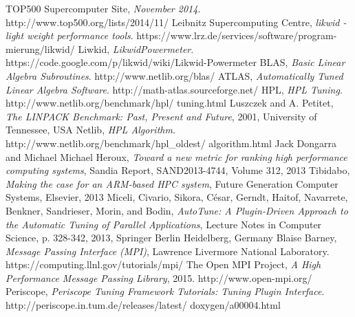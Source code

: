 \documentclass[10pt,twocolumn]{article}
\begin{document}
\begin{thebibliography}{9}
\raggedright
{}
  	TOP500 Supercomputer Site,
  	\emph{November 2014}.
  	http://www.top500.org/lists/2014/11/
	Leibnitz Supercomputing Centre,
	\emph{likwid - light weight performance tools}.
	https://www.lrz.de/services/software/program-mierung/likwid/
	Liwkid,
	\emph{LikwidPowermeter}.
	https://code.google.com/p/likwid/wiki/Likwid-Powermeter
	BLAS,
	\emph{Basic Linear Algebra Subroutines}.
	http://www.netlib.org/blas/
	ATLAS,
	\emph{Automatically Tuned Linear Algebra Software}.
	http://math-atlas.sourceforge.net/
	HPL,
	\emph{HPL Tuning}.
	http://www.netlib.org/benchmark/hpl/ tuning.html
	Luszczek and A. Petitet,
	\emph{The LINPACK Benchmark: Past, Present and Future},
	2001, University of Tennessee, USA
	Netlib,
	\emph{HPL Algorithm}.
	http://www.netlib.org/benchmark/hpl\_oldest/ algorithm.html
	Jack Dongarra and Michael Michael Heroux,
	\emph{Toward a new metric for ranking high performance computing systems},
	Sandia Report, SAND2013-4744, Volume 312, 2013
	Tibidabo,
	\emph{Making the case for an ARM-based HPC system},
	Future Generation Computer Systems, Elsevier, 2013
	Miceli, Civario, Sikora, César, Gerndt, Haitof, Navarrete, Benkner, Sandrieser, Morin, and Bodin,
	\emph{AutoTune: A Plugin-Driven Approach to the Automatic Tuning of Parallel Applications}, Lecture Notes in Computer Science, p. 328-342, 2013, Springer Berlin Heidelberg, Germany
	Blaise Barney,
	\emph{Message Passing Interface (MPI)},
	Lawrence Livermore National Laboratory.
	https://computing.llnl.gov/tutorials/mpi/
	The Open MPI Project,
	\emph{A High Performance Message Passing Library}, 2015.
	http://www.open-mpi.org/
	Periscope,
	\emph{Periscope Tuning Framework Tutorials: Tuning Plugin Interface}.
	http://periscope.in.tum.de/releases/latest/ doxygen/a00004.html
\end{thebibliography}
\end{document}
